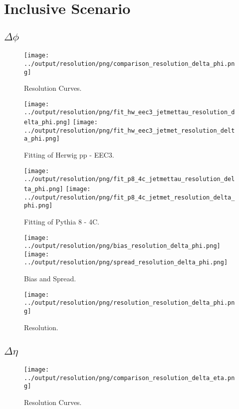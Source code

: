 \documentclass[11pt]{book}
\begin{document}
\chapter{Inclusive Scenario}
\section{$\Delta\phi$}

\begin{figure}[ht]
\centering
\texttt{[image: ../output/resolution/png/comparison\_resolution\_delta\_phi.png]}
\caption{Resolution Curves.}
\end{figure}


\begin{figure}[ht]
\centering
\texttt{[image: ../output/resolution/png/fit\_hw\_eec3\_jetmettau\_resolution\_delta\_phi.png]}
\texttt{[image: ../output/resolution/png/fit\_hw\_eec3\_jetmet\_resolution\_delta\_phi.png]}
\caption{Fitting of Herwig pp - EEC3.}
\end{figure}

\begin{figure}[ht]
\centering
\texttt{[image: ../output/resolution/png/fit\_p8\_4c\_jetmettau\_resolution\_delta\_phi.png]}
\texttt{[image: ../output/resolution/png/fit\_p8\_4c\_jetmet\_resolution\_delta\_phi.png]}
\caption{Fitting of Pythia 8 - 4C.}
\end{figure}

\begin{figure}[ht]
\centering
\texttt{[image: ../output/resolution/png/bias\_resolution\_delta\_phi.png]}
\texttt{[image: ../output/resolution/png/spread\_resolution\_delta\_phi.png]}
\caption{Bias and Spread.}
\end{figure}


\begin{figure}[ht]
\centering
\texttt{[image: ../output/resolution/png/resolution\_resolution\_delta\_phi.png]}
\caption{Resolution.}
\end{figure}
\clearpage


\section{$\Delta\eta$}

\begin{figure}[ht]
\centering
\texttt{[image: ../output/resolution/png/comparison\_resolution\_delta\_eta.png]}
\caption{Resolution Curves.}
\end{figure}
\end{document}
